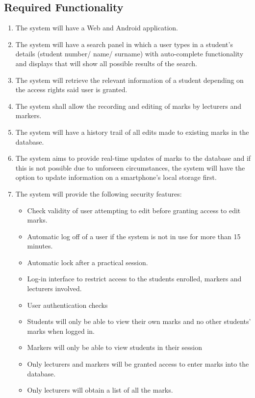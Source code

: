 \documentclass[a4paper]{article}
\begin{document}
		\subsection{Required Functionality}
		\begin{enumerate}
		\item The system will have a Web and Android application.
		\item The system will have a search panel in which a user types in a student's details (student number/ name/ surname) with auto-complete functionality and displays that will show all possible results of the search.
		\item The system will retrieve the relevant information of a student depending on the access rights said user is granted.
		\item The system shall allow the recording and editing of marks by lecturers and markers.
		\item The system will have a history trail of all edits made to existing marks in the database.
		\item The system aims to provide real-time updates of marks to the database and if this is not possible due to unforseen circumstances, the system will have the option to update information on a smartphone's local storage first.
		\item The system will provide the following security features:
		\begin{itemize}
			\item{Check validity of user attempting to edit before granting access to edit marks.}
			\item{Automatic log off of a user if the system is not in use for more than 15 minutes.}
			\item{Automatic lock after a practical session.}
			\item{Log-in interface to restrict access to the students enrolled, markers and lecturers involved.}
			\item{User authentication checks}
			\item{Students will only be able to view their own marks and no other students' marks when logged in.}
			\item{Markers will only be able to view students in their session}
			\item{Only lecturers and markers will be granted access to enter marks into the database.}
			\item{Only lecturers will obtain a list of all the marks.}
		
		\end{itemize}
		

\end{enumerate}
\end{document}
